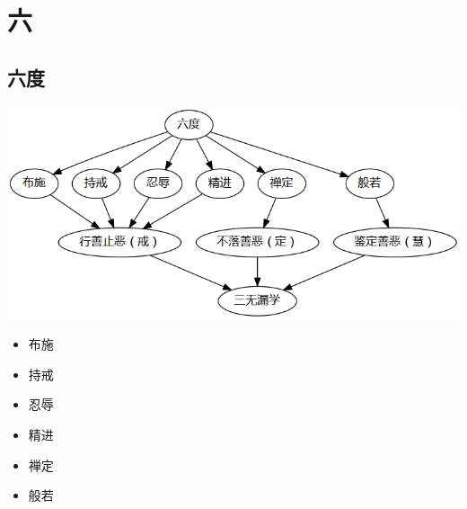 \section{六}

\subsection{六度}
\includegraphics[scale=0.5]{释家/images/六度.png}
\begin{itemize}
  \item 布施
  \item 持戒
  \item 忍辱
  \item 精进
  \item 禅定
  \item 般若
\end{itemize}
